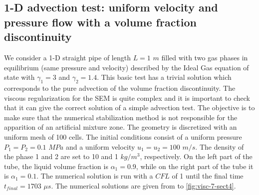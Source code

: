 \subsection{1-D advection test: uniform velocity and pressure flow with a volume fraction discontinuity}\label{sec:1d-advection-7-eq-sct4}
We consider a 1-D straight pipe of length $L=1$ $m$ filled with two gas phases in equilibrium (same pressure and velocity) described by the Ideal Gas equation of state with $\gamma_1 = 3$ and $\gamma_2 = 1.4$. This basic test has a trivial solution which corresponds to the pure advection of the volume fraction discontinuity. The viscous regularization for the SEM is quite complex and it is important to check that it can give the correct solution of a simple advection test. The objective is to make sure that the numerical stabilization method is not responsible for the apparition of an artificial mixture zone. The geometry is discretized with an uniform mesh of 100 cells. The initial conditions consist of a uniform pressure $P_1 = P_2 =0.1$ $MPa$ and a uniform velocity $u_1 = u_2 = 100$ $m/s$. The density of the phase 1 and 2 are set to 10 and 1 $kg/m^3$, respectively. On the left part of the tube, the liquid volume fraction is $\alpha_{1} = 0.9$, while on the right part of the tube it is $\alpha_{1} = 0.1$. The numerical solution is run with a $CFL$ of 1 until the final time $t_{final} = 1703 $ $\mu s$. The numerical solutions are given from  to \ref{fig:visc-7-sect4}.
%
